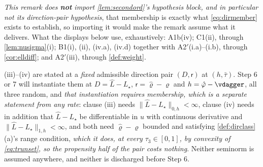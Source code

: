 \begin{remark}\label{rem:dirmember}
\emph{This remark does \textbf{not} import \cref{lem:secondord}'s hypothesis block, and in particular not
its direction-pair hypothesis}, that membership is exactly what \eqref{eq:dirmember} exists to
establish, so importing it would make the remark assume what it delivers. What the displays below use,
exhaustively: A1b(iv); C1(ii), through \cref{lem:nusigma}(i); B1(i), (ii), (iv.a), (iv.d) together with
A2$'$(i.a)--(i.b), through \cref{cor:elldiff}; and A2$'$(iii), through \cref{def:weight}.

(iii)--(iv) are stated at a \emph{fixed} admissible direction pair $(D,\mathsf r)$ at
$(h,\bar\tau)$. Step 6 or 7 will instantiate them at $D=\hat L-L_\star$, $\mathsf r=\hat\varrho-\varrho$
and $h=\hat\varphi-\vdagger$, all three random, and \emph{that instantiation requires membership, which
is a separate statement from any rate}: clause (iii) needs $\|\hat L-L_\star\|_{0,h}<\infty$, clause (iv)
needs in addition that $\hat L-L_\star$ be differentiable in $u$ with continuous derivative and
$\|\hat L-L_\star\|_{1,h}<\infty$, and both need $\hat\varrho-\varrho$ bounded and satisfying
\cref{def:dirclass}\textup{(a)}'s range condition, \emph{which it does, at every $\tau_3\in[0,1]$, by
convexity of \eqref{eq:trunset}, so the propensity half of the pair costs nothing}. Neither
seminorm is assumed anywhere, and neither is discharged before Step 6.


\end{remark}
